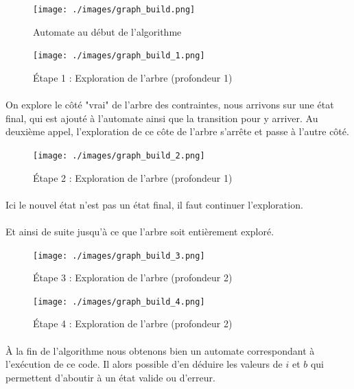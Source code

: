 \begin{figure}[H]
 \centering
 \texttt{[image: ./images/graph\_build.png]}
 \caption{Automate au début de l'algorithme}
\end{figure}


 
 \begin{figure}[H]
  \centering
  \texttt{[image: ./images/graph\_build\_1.png]}
  \caption{Étape 1 : Exploration de l'arbre (profondeur 1)}
 \end{figure}

 \paragraph{} On explore le côté "vrai" de l'arbre des contraintes, nous 
arrivons sur une état final, qui est 
ajouté à l'automate ainsi que la transition pour y arriver. Au deuxième appel, 
l'exploration de ce côte de l'arbre s'arrête et passe à l'autre côté.


 \begin{figure}[H]
  \centering
  \texttt{[image: ./images/graph\_build\_2.png]}
  \caption{Étape 2 : Exploration de l'arbre (profondeur 1)}
 \end{figure}
 \paragraph{} Ici le nouvel état n'est pas un état final, il faut continuer 
l'exploration.
 \paragraph{} Et ainsi de suite jusqu'à ce que l'arbre soit 
entièrement exploré.


 \begin{figure}[H]
  \centering
  \texttt{[image: ./images/graph\_build\_3.png]}
  \caption{Étape 3 : Exploration de l'arbre (profondeur 2)}
 \end{figure}

\begin{figure}[H]
  \centering
  \texttt{[image: ./images/graph\_build\_4.png]}
  \caption{Étape 4 : Exploration de l'arbre (profondeur 2)}
 \end{figure}


\paragraph{}
À la fin de l'algorithme nous obtenons bien un automate correspondant à 
l'exécution de ce code. Il alors possible d'en déduire les valeurs de $i$ et 
$b$ qui permettent d'aboutir à un état valide ou d'erreur.


